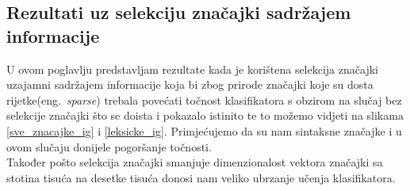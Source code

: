 \subsection{Rezultati uz selekciju značajki sadržajem informacije}

U ovom poglavlju predstavljam rezultate kada je korištena selekcija značajki uzajamni sadržajem informacije koja bi zbog prirode značajki koje su dosta rijetke(eng.~\textit{sparse}) trebala povećati točnost klasifikatora s obzirom na slučaj bez selekcije značajki što se doista i pokazalo istinito te to možemo vidjeti na slikama \ref{sve_znacajke_ig} i \ref{leksicke_ig}. Primjećujemo da su nam sintaksne značajke i u ovom slučaju donijele pogoršanje točnosti. \\
	Također pošto selekcija značajki smanjuje dimenzionalost vektora značajki sa stotina tisuća na desetke tisuća donosi nam veliko ubrzanje učenja klasifikatora.

